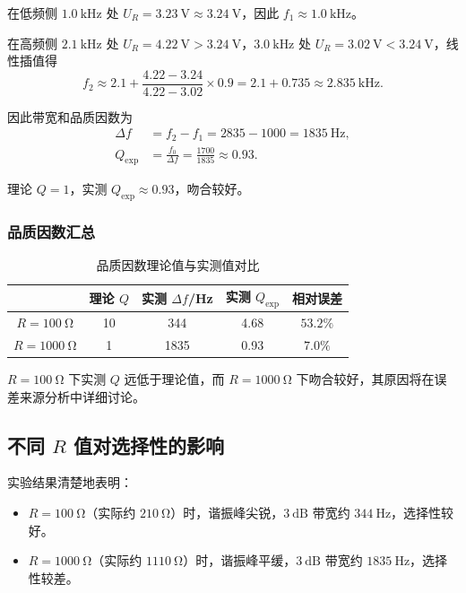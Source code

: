 在低频侧 \(\SI{1.0}{\kilo\hertz}\) 处 \(U_{R}=\SI{3.23}{\volt}\approx\SI{3.24}{\volt}\)，因此 \(f_{1}\approx\SI{1.0}{\kilo\hertz}\)。

在高频侧 \(\SI{2.1}{\kilo\hertz}\) 处 \(U_{R}=\SI{4.22}{\volt}>\SI{3.24}{\volt}\)，\(\SI{3.0}{\kilo\hertz}\) 处 \(U_{R}=\SI{3.02}{\volt}<\SI{3.24}{\volt}\)，线性插值得
\begin{equation}
    f_{2} \approx 2.1 + \frac{4.22-3.24}{4.22-3.02}\times 0.9 = 2.1 + 0.735 \approx \SI{2.835}{\kilo\hertz}.
\end{equation}

因此带宽和品质因数为
\begin{align}
    \Delta f &= f_{2}-f_{1} = 2835-1000 = \SI{1835}{\hertz}, \\
    Q_{\exp} &= \frac{f_{0}}{\Delta f} = \frac{1700}{1835} \approx 0.93.
\end{align}

理论 \(Q=1\)，实测 \(Q_{\exp}\approx 0.93\)，吻合较好。

\subsubsection{品质因数汇总}

\begin{table}[H]
    \centering
    \caption{品质因数理论值与实测值对比}
    \label{e4-tab:Q-comparison}
    \begin{tabular}{ccccc}
        \toprule
        & 理论 \(Q\) & 实测 \(\Delta f\)/Hz & 实测 \(Q_{\exp}\) & 相对误差 \\
        \midrule
        \(R=\SI{100}{\ohm}\) & 10 & 344 & 4.68 & \(53.2\%\) \\
        \(R=\SI{1000}{\ohm}\) & 1 & 1835 & 0.93 & \(7.0\%\) \\
        \bottomrule
    \end{tabular}
\end{table}

\(R=\SI{100}{\ohm}\) 下实测 \(Q\) 远低于理论值，而 \(R=\SI{1000}{\ohm}\) 下吻合较好，其原因将在误差来源分析中详细讨论。

\subsection{不同 \(R\) 值对选择性的影响}

实验结果清楚地表明：
\begin{itemize}
    \item \(R=\SI{100}{\ohm}\)（实际约 \(\SI{210}{\ohm}\)）时，谐振峰尖锐，\(\SI{3}{\dB}\) 带宽约 \(\SI{344}{\hertz}\)，选择性较好。
    \item \(R=\SI{1000}{\ohm}\)（实际约 \(\SI{1110}{\ohm}\)）时，谐振峰平缓，\(\SI{3}{\dB}\) 带宽约 \(\SI{1835}{\hertz}\)，选择性较差。
\end{itemize}

